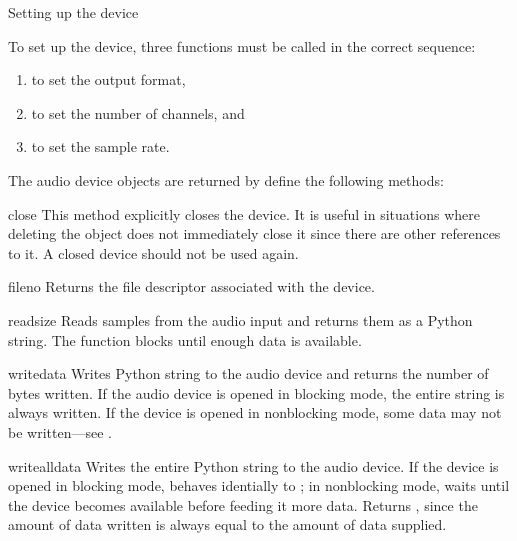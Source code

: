 Setting up the device

To set up the device, three functions must be called in the correct
sequence:
\begin{enumerate}
\item {} to set the output format,
\item {} to set the number of channels, and
\item {} to set the sample rate.
\end{enumerate}

The audio device objects are returned by  define the
following methods:

\begin{methoddesc}{close}{}
This method explicitly closes the device.  It is useful in situations
where deleting the object does not immediately close it since there are
other references to it.  A closed device should not be used again.
\end{methoddesc}

\begin{methoddesc}{fileno}{}
Returns the file descriptor associated with the device.
\end{methoddesc}

\begin{methoddesc}{read}{size}
Reads  samples from the audio input and returns them as a
Python string.  The function blocks until enough data is available.
\end{methoddesc}

\begin{methoddesc}{write}{data}
Writes Python string  to the audio device and returns the
number of bytes written.  If the audio device is opened in blocking
mode, the entire string is always written.  If the device is opened in
nonblocking mode, some data may not be written---see
.
\end{methoddesc}

\begin{methoddesc}{writeall}{data}
Writes the entire Python string  to the audio device.  If the
device is opened in blocking mode, behaves identially to
; in nonblocking mode, waits until the device becomes
available before feeding it more data.  Returns , since the
amount of data written is always equal to the amount of data supplied.
\end{methoddesc}

